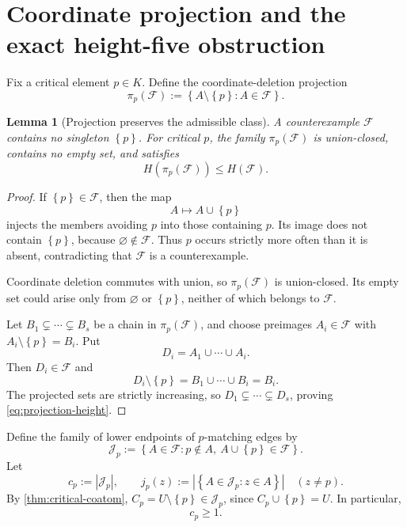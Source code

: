 \documentclass[11pt,reqno]{amsart}
\numberwithin{equation}{section}
\newtheorem{lemma}[lemma]{Lemma}
\theoremstyle{definition}
\theoremstyle{remark}
\newcommand{\F}{\mathcal{F}}
\newcommand{\J}{\mathcal{J}}
\newcommand{\1}{\mathbf{1}}
\newcommand{\set}[1]{\left\{#1\right\}}
\newcommand{\abs}[1]{\left|#1\right|}
\begin{document}
\section{Coordinate projection and the exact height-five obstruction}

Fix a critical element \(p\in K\).  Define the coordinate-deletion projection
\begin{equation}\label{eq:projection}
\pi_p(\F):=\set{A\setminus\set{p}:A\in\F}.
\end{equation}

\begin{lemma}[Projection preserves the admissible class]\label{lem:projection-class}
A counterexample \(\F\) contains no singleton \(\set{p}\).  For critical \(p\), the family \(\pi_p(\F)\) is union-closed, contains no empty set, and satisfies
\begin{equation}\label{eq:projection-height}
H(\pi_p(\F))\le H(\F).
\end{equation}
\end{lemma}

\begin{proof}
If \(\set{p}\in\F\), then the map
\[
A\longmapsto A\cup\set{p}
\]
injects the members avoiding \(p\) into those containing \(p\).  Its image does not contain \(\set{p}\), because \(\varnothing\notin\F\).  Thus \(p\) occurs strictly more often than it is absent, contradicting that \(\F\) is a counterexample.

Coordinate deletion commutes with union, so \(\pi_p(\F)\) is union-closed.  Its empty set could arise only from \(\varnothing\) or \(\set{p}\), neither of which belongs to \(\F\).

Let
\(
B_1\subsetneq\cdots\subsetneq B_s
\)
be a chain in \(\pi_p(\F)\), and choose preimages \(A_i\in\F\) with \(A_i\setminus\set{p}=B_i\).  Put
\[
D_i=A_1\cup\cdots\cup A_i.
\]
Then \(D_i\in\F\) and
\[
D_i\setminus\set{p}=B_1\cup\cdots\cup B_i=B_i.
\]
The projected sets are strictly increasing, so
\(
D_1\subsetneq\cdots\subsetneq D_s
\), proving \cref{eq:projection-height}.
\end{proof}

Define the family of lower endpoints of \(p\)-matching edges by
\begin{equation}\label{eq:Jp}
\J_p
:=
\set{A\in\F:p\notin A,\ A\cup\set{p}\in\F}.
\end{equation}
Let
\begin{equation}\label{eq:cp-jp}
c_p:=\abs{\J_p},
\qquad
j_p(z):=\abs{\set{A\in\J_p:z\in A}}
\quad(z\ne p).
\end{equation}
By \cref{thm:critical-coatom},
\(
C_p=U\setminus\set{p}\in\J_p
\), since \(C_p\cup\set{p}=U\).  In particular,
\begin{equation}\label{eq:cp-positive}
c_p\ge1.
\end{equation}
\end{document}
